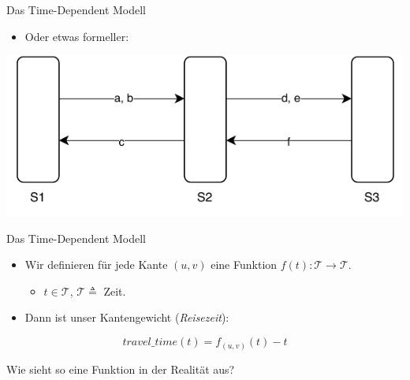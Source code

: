 \begin{frame}{Das Time-Dependent Modell}
	\begin{itemize}
		\item Oder etwas formeller:
	\end{itemize}

	\begin{center}
		\includegraphics[width=\linewidth]{images/time-dependent/formal.pdf}
	\end{center}
\end{frame}


\begin{frame}{Das Time-Dependent Modell}
	\begin{itemize}
		\item Wir definieren für jede Kante $(u,v)$ eine\* Funktion $f(t): \mathcal{T} \rightarrow \mathcal{T}$.
		\begin{itemize}
			\item $t \in \mathcal{T}$, $\mathcal{T} \triangleq$ Zeit.
		\end{itemize}
	\end{itemize}
	\vspace{2em}
	\pause
	\begin{itemize}
		\item Dann ist unser Kantengewicht (\textit{Reisezeit}):
	\end{itemize}
	
	\begin{equation*}
		travel\_time(t) = f_{(u,v)}(t) - t
	\end{equation*}
	\pause

	\vspace{5em}
	\begin{block}{}
		Wie sieht so eine Funktion in der Realität aus?
	\end{block}
\end{frame}


